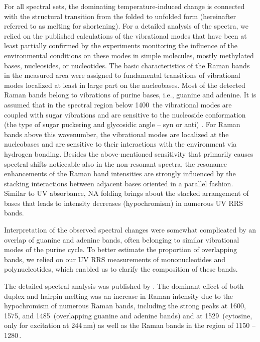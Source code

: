 For all spectral sets, the dominating temperature-induced change is connected
with the structural transition from the folded to unfolded form (hereinafter
referred to as melting for shortening).
For a detailed analysis of the spectra, we relied on the published calculations
of the vibrational modes that have been at least partially confirmed by the
experiments monitoring the influence of the environmental conditions on these
modes in simple molecules, mostly methylated bases, nucleosides, or
nucleotides.
The basic characteristics of the Raman bands in the measured area were assigned
to fundamental transitions of vibrational modes localized at least in large
part on the nucleobases.
Most of the detected Raman bands belong to vibrations of purine bases, i.e.,
guanine and adenine.
It is assumed that in the spectral region below 1400\,\icm{} the vibrational
modes are coupled with sugar vibrations and are sensitive to the nucleoside
conformation (the type of sugar puckering and glycosidic angle -- syn or anti)
\parencite{%
	Benevides2005,%
	Nishimura1986b%
}.
For Raman bands above this wavenumber, the vibrational modes are localized at
the nucleobases and are sensitive to their interactions with the environment
via hydrogen bonding.
Besides the above-mentioned sensitivity that primarily causes spectral shifts
noticeable also in the non-resonant spectra, the resonance enhancements of the
Raman band intensities are strongly influenced by the stacking interactions
between adjacent bases oriented in a parallel fashion.
Similar to UV absorbance, NA folding brings about the stacked arrangement of
bases that leads to intensity decreases (hypochromism) in numerous UV RRS
bands.

Interpretation of the observed spectral changes were somewhat complicated by an
overlap of guanine and adenine bands, often belonging to similar vibrational
modes of the purine cycle.
To better estimate the proportion of overlapping bands, we relied on our UV RRS
measurements of mononucleotides and polynucleotides, which enabled us to
clarify the composition of these bands.

The detailed spectral analysis was published by
\textcite{Klener2021}.
The dominant effect of both duplex and hairpin melting was an increase in
Raman intensity due to the hypochromism of numerous Raman bands, including the
strong peaks at 1600, 1575, and 1485\,\icm{} (overlapping guanine and adenine
bands) and at 1529\,\icm{} (cytosine, only for excitation at 244\,nm) as well
as the Raman bands in the region of 1150 -- 1280\,\icm{}.

